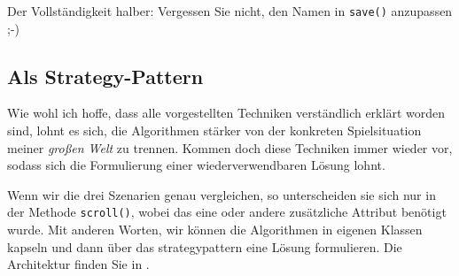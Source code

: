 
Der Vollständigkeit halber: Vergessen Sie nicht, den Namen in \texttt{save()} anzupassen ;-)

\subsection{Als Strategy-Pattern}

Wie wohl ich hoffe, dass alle vorgestellten Techniken verständlich erklärt worden sind, lohnt es sich, die Algorithmen stärker von der konkreten Spielsituation meiner \emph{großen Welt} zu trennen. Kommen doch diese Techniken immer wieder vor, sodass sich die Formulierung einer wiederverwendbaren Lösung lohnt.

Wenn wir die drei Szenarien genau vergleichen, so unterscheiden sie sich nur in der Methode \texttt{scroll()}, wobei das eine oder andere zusätzliche Attribut benötigt wurde. Mit anderen Worten, wir können die Algorithmen in eigenen Klassen kapseln und dann über das \Gls{strategypattern} eine Lösung formulieren. Die Architektur finden Sie in . 
 

